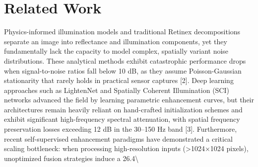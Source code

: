 \documentclass[11pt,a4paper]{article}
\begin{document}
\section{Related Work}
Physics-informed illumination models and traditional Retinex decompositions separate an image into reflectance and illumination components, yet they fundamentally lack the capacity to model complex, spatially variant noise distributions. These analytical methods exhibit catastrophic performance drops when signal-to-noise ratios fall below 10 dB, as they assume Poisson-Gaussian stationarity that rarely holds in practical sensor captures [2]. Deep learning approaches such as LightenNet and Spatially Coherent Illumination (SCI) networks advanced the field by learning parametric enhancement curves, but their architectures remain heavily reliant on hand-crafted initialization schemes and exhibit significant high-frequency spectral attenuation, with spatial frequency preservation losses exceeding 12 dB in the 30–150 Hz band [3]. Furthermore, recent self-supervised enhancement paradigms have demonstrated a critical scaling bottleneck: when processing high-resolution inputs (>1024×1024 pixels), unoptimized fusion strategies induce a 26.4\textbackslash{}%
\end{document}
